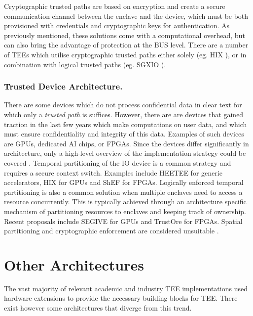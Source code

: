 \documentclass[runningheads,a4paper]{uwsese}
\begin{document}
Cryptographic trusted paths are based on encryption and create a secure
communication channel between the enclave and the device, which must be both
provisioned with credentials and cryptographic keys for authentication. As
previously mentioned, these solutions come with a computational overhead, but
can also bring the advantage of protection at the \gls{BUS} level. There are a
number of \glspl{TEE} which utilise cryptographic trusted paths either solely
(eg. HIX \cite{tee_hix}), or in combination with logical trusted paths (eg.
SGXIO \cite{tee_sgxio}).   

\subsubsection{Trusted Device Architecture.}

There are some devices which do not process confidential data in clear text for
which only a \emph{trusted path} is suffices. However, there are are devices
that gained traction in the last few years which make computations on user
data, and which must ensure confidentiality and integrity of this data.
Examples of such devices are GPUs, dedicated AI chips, or FPGAs. Since the
devices differ significantly in architecture, only a high-level overview of the
implementation strategy could be covered \cite{tee_hw_sup}. Temporal
partitioning of the IO device is a common strategy and requires a secure
context switch. Examples include HEETEE \cite{tee_heetee} for generic
accelerators, HIX \cite{tee_hix} for GPUs and ShEF \cite{tee_shef} for FPGAs.
Logically enforced temporal partitioning is also a common solution when
multiple enclaves need to access a resource concurrently. This is typically
achieved through an architecture specific mechanism of partitioning resources
to enclaves and keeping track of ownership. Recent proposals include SEGIVE
\cite{tee_segive} for GPUs and TrustOre \cite{tee_trustore} for FPGAs. Spatial
partitioning and cryptographic enforcement are considered unsuitable
\cite{tee_hw_sup}.



\section{Other Architectures}

The vast majority of relevant academic and industry \gls{TEE} implementations
used hardware extensions to provide the necessary building blocks for
\gls{TEE}. There exist however some architectures that diverge from this trend.
\end{document}
